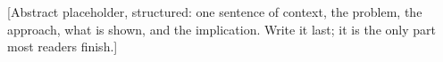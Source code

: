 \begin{summary}
[Abstract placeholder, structured: one sentence of context, the problem, the approach, what is shown, and the implication. Write it last; it is the only part most readers finish.]
\end{summary}
